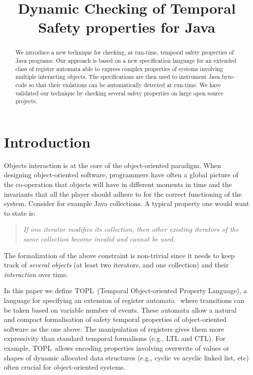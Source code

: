 \documentclass{sigplanconf}[10pt] %
\title{Dynamic Checking of Temporal Safety properties for Java}
\newcommand{\TPL}{TOPL}
\begin{document}
\maketitle

\begin{abstract} %
We introduce a new technique for checking, at run-time, temporal safety properties of Java programs.
Our approach is based on a new specification language for an extended class of register automata able to express complex properties of 
systems involving multiple interacting objects. The specifications are then used to instrument Java byte-code so that their violations can be automatically detected at run-time. 
We have validated our technique by checking several safety properties on large open source projects.
\end{abstract}


\section{Introduction} %
Objects interaction is at the core of the object-oriented paradigm. When designing object-oriented software, 
programmers have often  a global picture of the co-operation that objects will have in different moments in time and the 
invariants that all the player should adhere to for the correct functioning of the system.
Consider for  example  Java collections. A typical property one would want to state is:
\begin{quote}
{\em If one iterator modifies its collection, then other existing iterators of the same collection become invalid and cannot be used.}
\end{quote}
\noindent
The formalization of the above constraint is non-trivial since it 
needs to keep track of {\em several objects} (at least two iterators, and one collection) and their {\em interaction} over time.

In this paper we define  \TPL\ (Temporal Object-oriented Property Language), a language for specifying an extension of register automata~\cite{DBLP:journals/tocl/DemriL09} where transitions can be taken based on variable number of 
events. These automata allow a natural and compact formalisation of safety temporal properties of
object-oriented software as the one above. 
The manipulation of registers  gives them more expressivity than standard temporal formalisms (e.g., LTL and CTL).  For example, \TPL \ allows encoding properties involving overwrite of values or shapes of dynamic allocated data structures (e.g., cyclic vs acyclic linked list, etc) often crucial for object-oriented systems.
\end{document}
